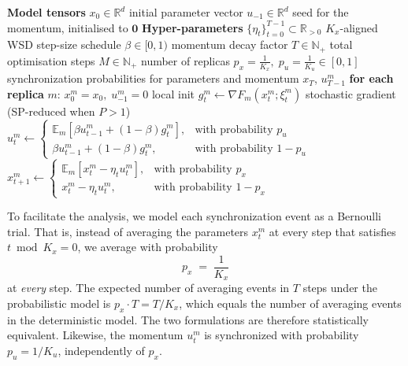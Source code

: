 \documentclass{article}
\begin{document}
\begin{algorithm}[ht]
\caption{FAUST-SGDM (probabilistic synchronization formulation)}
\label{alg:desloc_sgdm}
\begin{algorithmic}[1]
\REQUIRE \textbf{Model tensors}
\STATE $x_0 \in \mathbb{R}^d$ \hfill initial parameter vector
\STATE $u_{-1} \in \mathbb{R}^d$ \hfill seed for the momentum, initialised to $\mathbf{0}$
\REQUIRE \textbf{Hyper-parameters}
\STATE $\{\eta_t\}_{t=0}^{T-1} \subset \mathbb{R}_{>0}$ \hfill $K_x$-aligned WSD step-size schedule
\STATE $\beta \in [0,1)$ \hfill momentum decay factor
\STATE $T \in \mathbb{N}_+$ \hfill total optimisation steps
\STATE $M \in \mathbb{N}_+$ \hfill number of replicas
\STATE $p_x = \frac{1}{K_x},\; p_u = \frac{1}{K_u} \in [0,1]$ \hfill synchronization probabilities for parameters and momentum
\ENSURE $x_T$, $u_{T-1}^m$
\STATE \textbf{for each replica} $m$: $x_0^m = x_0,\; u_{-1}^m = 0$ \hfill local init
        \STATE $g_t^m \leftarrow \nabla F_m(x_t^m; \xi_t^m)$ \hfill stochastic gradient (SP-reduced when $P > 1$)
        \STATE $u_t^m \leftarrow \begin{cases} \mathbb{E}_m[\beta u_{t-1}^m + (1-\beta) g_t^m], & \text{with probability } p_u \\ \beta u_{t-1}^m + (1-\beta) g_t^m, & \text{with probability } 1-p_u \end{cases}$
        \STATE $x_{t+1}^m \leftarrow \begin{cases} \mathbb{E}_m[x_t^m - \eta_t u_t^m], & \text{with probability } p_x \\ x_t^m - \eta_t u_t^m, & \text{with probability } 1-p_x \end{cases}$
    \ENDFOR
\ENDFOR
\end{algorithmic}
\end{algorithm}

To facilitate the analysis, we model each synchronization event as a Bernoulli
trial. That is, instead of averaging the parameters $x_t^m$ at every step that
satisfies $t \bmod K_x = 0$, we average with probability
\begin{equation}
\label{eq:prob_equiv}
p_x \;=\; \frac{1}{K_x}
\end{equation}
at \emph{every} step. The expected number of averaging events in $T$ steps under
the probabilistic model is $p_x \cdot T = T / K_x$, which equals the number of
averaging events in the deterministic model. The two formulations are therefore
statistically equivalent. Likewise, the momentum $u_t^m$ is synchronized with
probability $p_u = 1/K_u$, independently of $p_x$.
\end{document}
